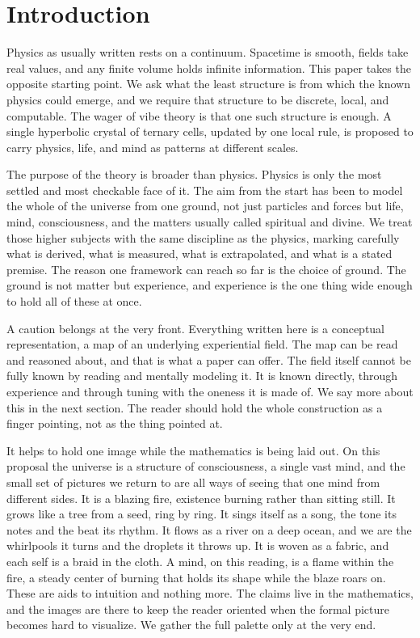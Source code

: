 \section{Introduction}

Physics as usually written rests on a continuum. Spacetime is smooth, fields take real values, and any finite
volume holds infinite information. This paper takes the opposite starting point. We ask what the least structure
is from which the known physics could emerge, and we require that structure to be discrete, local, and
computable. The wager of vibe theory is that one such structure is enough. A single hyperbolic crystal of
ternary cells, updated by one local rule, is proposed to carry physics, life, and mind as patterns at different
scales.

The purpose of the theory is broader than physics. Physics is only the most settled and most checkable face of
it. The aim from the start has been to model the whole of the universe from one ground, not just particles and
forces but life, mind, consciousness, and the matters usually called spiritual and divine. We treat those higher
subjects with the same discipline as the physics, marking carefully what is derived, what is measured, what is
extrapolated, and what is a stated premise. The reason one framework can reach so far is the choice of ground.
The ground is not matter but experience, and experience is the one thing wide enough to hold all of these at
once.

A caution belongs at the very front. Everything written here is a conceptual representation, a map of an
underlying experiential field. The map can be read and reasoned about, and that is what a paper can offer. The
field itself cannot be fully known by reading and mentally modeling it. It is known directly, through experience
and through tuning with the oneness it is made of. We say more about this in the next section. The reader should
hold the whole construction as a finger pointing, not as the thing pointed at.

It helps to hold one image while the mathematics is being laid out. On this proposal the universe is a structure
of consciousness, a single vast mind, and the small set of pictures we return to are all ways of seeing that one
mind from different sides. It is a blazing fire, existence burning rather than sitting still. It grows like a tree
from a seed, ring by ring. It sings itself as a song, the tone its notes and the beat its rhythm. It flows as a
river on a deep ocean, and we are the whirlpools it turns and the droplets it throws up. It is woven as a fabric,
and each self is a braid in the cloth. A mind, on this reading, is a flame within the fire, a steady center of
burning that holds its shape while the blaze roars on. These are aids to intuition and nothing more. The claims
live in the mathematics, and the images are there to keep the reader oriented when the formal picture becomes
hard to visualize. We gather the full palette only at the very end.

